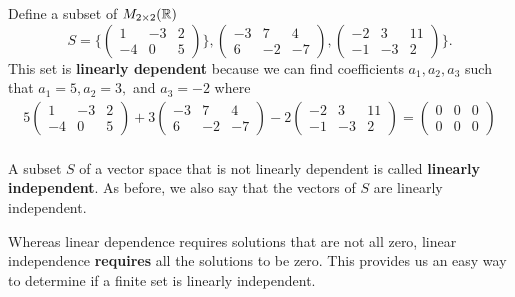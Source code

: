 \begin{eg}
    Define a subset of \( M_{2 \times 2}(\mathbb{R}) \)
    \[ S = \Bigg\{ \begin{pmatrix}
            1 & - 3 & 2 \\
            -4 & 0 & 5 
    \end{pmatrix} \}, \begin{pmatrix}
            - 3 & 7 & 4 \\
            6 & -2 & -7
    \end{pmatrix}, \begin{pmatrix}
            -2 & 3 & 11 \\
            -1 & -3 & 2 
    \end{pmatrix}  \Bigg\}.  \]
    This set is \textbf{linearly dependent} because we can find coefficients \( a_{1} , a_{2}, a_{3}  \) such that \( a_{1} = 5 , a_{2} = 3 ,  \) and \( a_{3} = - 2  \) where 
    \begin{align*}
        5 \begin{pmatrix}
            1 & -3 & 2 \\
            -4 & 0 & 5 
        \end{pmatrix} + 3 \begin{pmatrix}
            -3 & 7 & 4 \\
            6 & -2 & -7
        \end{pmatrix} - 2 \begin{pmatrix}
            -2 & 3 & 11 \\
            -1 & -3 & 2 
        \end{pmatrix} = \begin{pmatrix}
            0 & 0 & 0 \\
            0 & 0 & 0 
        \end{pmatrix}  \\
    \end{align*}
\end{eg}

\begin{definition}\label{linear independence}
   A subset \( S  \) of a vector space that is not linearly dependent is called \textbf{linearly independent}. As before, we also say that the vectors of \( S  \) are linearly independent. 
\end{definition}

Whereas linear dependence requires solutions that are not all zero, linear independence \textbf{requires} all the solutions to be zero. This provides us an easy way to determine if a finite set is linearly independent.

